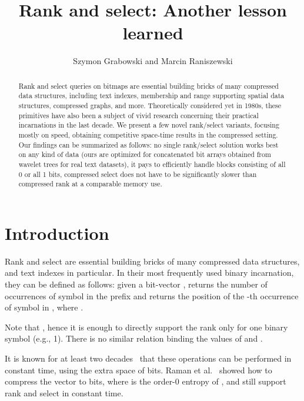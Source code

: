 \documentclass{llncs}
\begin{document}
\title{Rank and select: Another lesson learned}


\author{Szymon Grabowski
and
Marcin Raniszewski
}


\maketitle

\begin{abstract}
Rank and select queries on bitmaps are essential building bricks of 
many compressed data structures, including 
text indexes, membership and range supporting spatial data structures, 
compressed graphs, and more.
Theoretically considered yet in 1980s, these primitives have also been 
a subject of vivid research concerning their practical incarnations 
in the last decade.
We present a few novel rank/select variants, focusing mostly on speed, 
obtaining competitive space-time results in the compressed setting.
Our findings can be summarized as follows:  no single rank/select solution 
works best on any kind of data (ours are optimized for 
concatenated bit arrays obtained from wavelet trees for real text datasets), 
 it pays to 
efficiently 
handle blocks consisting of all 0 or all 1 bits,
 compressed select does not have to be significantly slower than 
compressed rank at a comparable memory use.
\end{abstract}

\section{Introduction}
\noindent 
Rank and select are essential building bricks of many compressed 
data structures, and text indexes in particular.
In their most frequently used binary incarnation, they can be defined 
as follows:
given a bit-vector , 
 returns the number of occurrences of symbol  
in the prefix  
and  returns the position of the -th occurrence 
of symbol  in , where .

Note that , hence it is enough 
to directly support the rank only for one binary symbol (e.g., 1).
There is no similar relation binding the values of  
and .

It is known for at least two decades~\cite{Jac1989,Clark1996,Munro1996} that 
these operations can be performed in constant time, 
using the extra space of  bits.
Raman et al.~\cite{RamanRR02} showed how to compress the vector  to 
 bits, where  is the order-0 entropy of , 
and still support rank and select in constant time.
\end{document}
